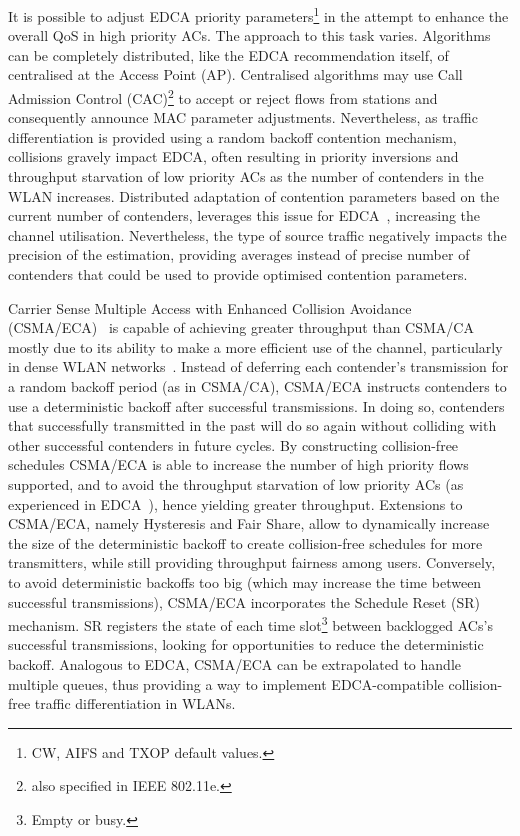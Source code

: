 \documentclass[a4paper]{article}
\begin{document}
It is possible to adjust EDCA priority parameters\footnote{CW, AIFS and TXOP default values.} in the attempt to enhance the overall QoS in high priority ACs. The approach to this task varies. Algorithms can be completely distributed, like the EDCA recommendation itself, of centralised at the Access Point (AP). Centralised algorithms may use Call Admission Control (CAC)\footnote{also specified in IEEE 802.11e.} to accept or reject flows from stations and consequently announce MAC parameter adjustments. Nevertheless, as traffic differentiation is provided using a random backoff contention mechanism, collisions gravely impact EDCA, often resulting in priority inversions and throughput starvation of low priority ACs as the number of contenders in the WLAN increases. Distributed adaptation of contention parameters based on the current number of contenders,  leverages this issue for EDCA~\cite{1208922,lopez-toledo2006aoi}, increasing the channel utilisation. Nevertheless, the type of source traffic negatively impacts the precision of the estimation, providing averages instead of precise number of contenders that could be used to provide optimised contention parameters.

Carrier Sense Multiple Access with Enhanced Collision Avoidance (CSMA/ECA)~\cite{sanabria2014high,research2standards} is capable of achieving greater throughput than CSMA/CA mostly due to its ability to make a more efficient use of the channel, particularly in dense WLAN networks~\cite{sanabria2014high}. Instead of deferring each contender's transmission for a random backoff period (as in CSMA/CA), CSMA/ECA instructs contenders to use a deterministic backoff after successful transmissions. In doing so, contenders that successfully transmitted in the past will do so again without colliding with other successful contenders in future cycles. By constructing collision-free schedules CSMA/ECA is able to increase the number of high priority flows supported, and to avoid the throughput starvation of low priority ACs (as experienced in EDCA~\cite{990806}), hence yielding greater throughput. Extensions to CSMA/ECA, namely Hysteresis and Fair Share, allow to dynamically increase the size of the deterministic backoff to create collision-free schedules for more transmitters, while still providing throughput fairness among users. Conversely, to avoid deterministic backoffs too big (which may increase the time between successful transmissions), CSMA/ECA incorporates the Schedule Reset (SR) mechanism. SR registers the state of each time slot\footnote{Empty or busy.} between backlogged ACs's successful transmissions, looking for opportunities to reduce the deterministic backoff. Analogous to EDCA, CSMA/ECA can be extrapolated to handle multiple queues, thus providing a way to implement EDCA-compatible collision-free traffic differentiation in WLANs.
\end{document}
